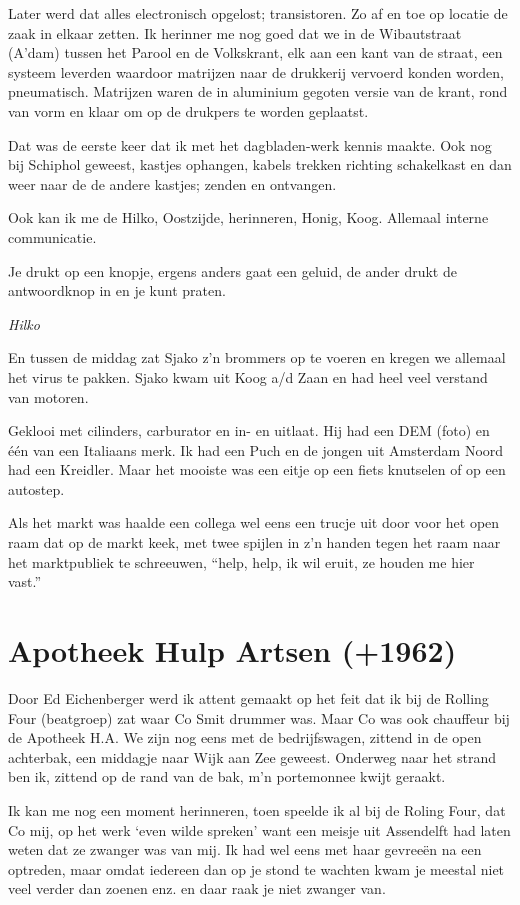 \documentclass[10pt,twoside,openright]{memoir}
\begin{document}
Later werd dat alles electronisch opgelost; transistoren. Zo af en toe op locatie de zaak in elkaar zetten. Ik herinner me nog goed dat we in de Wibautstraat (A’dam) tussen het Parool en de Volkskrant, elk aan een kant van de straat, een systeem leverden waardoor matrijzen naar de drukkerij vervoerd konden worden, pneumatisch. Matrijzen waren de in aluminium gegoten versie van de krant, rond van vorm en klaar om op de drukpers te worden geplaatst. 

Dat was de eerste keer dat ik met het dagbladen-werk kennis maakte. Ook nog bij Schiphol geweest, kastjes ophangen, kabels trekken richting schakelkast en dan weer naar de de andere kastjes; zenden en ontvangen. 

Ook kan ik me de Hilko, Oostzijde, herinneren, Honig, Koog. Allemaal interne communicatie. 

Je drukt op een knopje, ergens anders gaat een geluid, de ander drukt de antwoordknop in en je kunt praten.	

\emph{Hilko}

En tussen de middag zat Sjako z'n brommers op te voeren en kregen we allemaal het virus te pakken. Sjako kwam uit Koog a/d Zaan en had heel veel verstand van motoren. 

Geklooi met cilinders, carburator en in- en uitlaat. Hij had een DEM (foto) en één van een Italiaans merk. Ik had een Puch en de jongen uit Amsterdam Noord had een Kreidler. Maar het mooiste was een eitje op een fiets knutselen of op een autostep.

Als het markt was haalde een collega wel eens een trucje uit door voor het open raam dat op de markt keek, met twee spijlen in z'n handen tegen het raam naar het marktpubliek te schreeuwen, “help, help, ik wil eruit, ze houden me hier vast.”

\chapter{Apotheek Hulp Artsen (+1962)} %
\label{cha:apotheek}

Door Ed Eichenberger werd ik attent gemaakt op het feit dat ik bij de Rolling Four (beatgroep) zat waar Co Smit drummer was. Maar Co was ook chauffeur bij de Apotheek H.A. We zijn nog eens met de bedrijfswagen, zittend in de open achterbak, een middagje naar Wijk aan Zee geweest. Onderweg naar het strand ben ik, zittend op de rand van de bak, m’n portemonnee kwijt geraakt.

Ik kan me nog een moment herinneren, toen speelde ik al bij de Roling Four, dat Co mij, op het werk `even wilde spreken' want een meisje uit Assendelft had laten weten dat ze zwanger was van mij. Ik had wel eens met haar gevreeën na een optreden, maar omdat iedereen dan op je stond te wachten kwam je meestal niet veel verder dan zoenen enz. en daar raak je niet zwanger van. 
\end{document}
